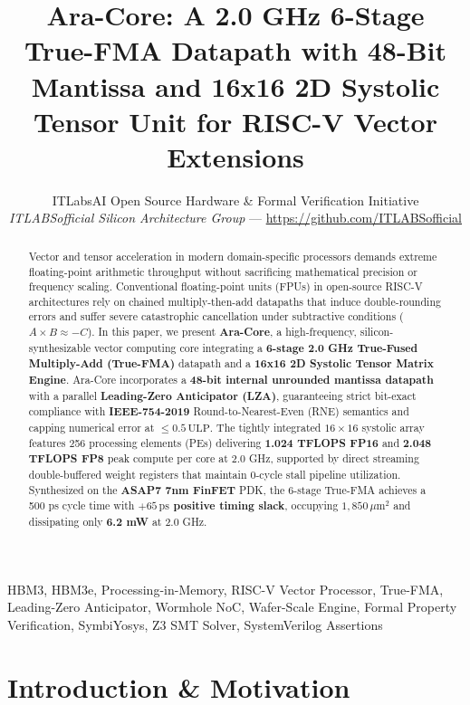 \documentclass[journal,10pt,twocolumn]{IEEEtran}
\title{Ara-Core: A 2.0 GHz 6-Stage True-FMA Datapath with 48-Bit Mantissa and 16x16 2D Systolic Tensor Unit for RISC-V Vector Extensions}
\author{ITLabsAI Open Source Hardware \& Formal Verification Initiative\\
\textit{ITLABSofficial Silicon Architecture Group} --- \url{https://github.com/ITLABSofficial}}
\begin{document}
\maketitle
\begin{abstract}
Vector and tensor acceleration in modern domain-specific processors demands extreme floating-point arithmetic throughput without sacrificing mathematical precision or frequency scaling. Conventional floating-point units (FPUs) in open-source RISC-V architectures rely on chained multiply-then-add datapaths that induce double-rounding errors and suffer severe catastrophic cancellation under subtractive conditions ($A \times B \approx -C$). In this paper, we present \textbf{Ara-Core}, a high-frequency, silicon-synthesizable vector computing core integrating a \textbf{6-stage 2.0 GHz True-Fused Multiply-Add (True-FMA)} datapath and a \textbf{16x16 2D Systolic Tensor Matrix Engine}. Ara-Core incorporates a \textbf{48-bit internal unrounded mantissa datapath} with a parallel \textbf{Leading-Zero Anticipator (LZA)}, guaranteeing strict bit-exact compliance with \textbf{IEEE-754-2019} Round-to-Nearest-Even (RNE) semantics and capping numerical error at $\le 0.5\,\text{ULP}$. The tightly integrated $16 \times 16$ systolic array features 256 processing elements (PEs) delivering \textbf{1.024 TFLOPS FP16} and \textbf{2.048 TFLOPS FP8} peak compute per core at 2.0 GHz, supported by direct streaming double-buffered weight registers that maintain 0-cycle stall pipeline utilization. Synthesized on the \textbf{ASAP7 7nm FinFET} PDK, the 6-stage True-FMA achieves a 500 ps cycle time with \textbf{$+65\,\text{ps}$ positive timing slack}, occupying \textbf{$1,850\,\mu\text{m}^2$} and dissipating only \textbf{6.2 mW} at 2.0 GHz.
\end{abstract}
\begin{IEEEkeywords}
HBM3, HBM3e, Processing-in-Memory, RISC-V Vector Processor, True-FMA, Leading-Zero Anticipator, Wormhole NoC, Wafer-Scale Engine, Formal Property Verification, SymbiYosys, Z3 SMT Solver, SystemVerilog Assertions
\end{IEEEkeywords}


\section{Introduction \& Motivation}
\end{document}
